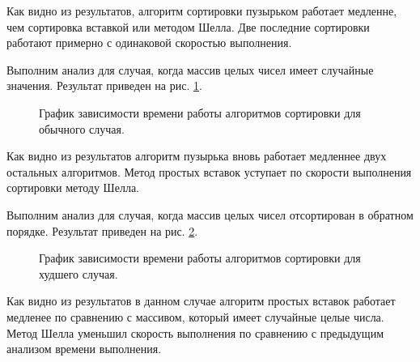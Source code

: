 Как видно из результатов, алгоритм сортировки пузырьком работает медленне, чем сортировка вставкой или методом Шелла. Две последние сортировки работают примерно с одинаковой скоростью выполнения. 

Выполним анализ для случая, когда массив целых чисел имеет случайные значения. Результат приведен на рис. \ref{fg:ref2}.
\begin{figure}[H]
	\centering
	\caption{График зависимости времени работы алгоритмов сортировки для обычного случая.} 
	\label{fg:ref2}
\end{figure}
Как видно из результатов алгоритм пузырька вновь работает медленнее двух остальных алгоритмов. Метод простых вставок уступает по скорости выполнения сортировки методу Шелла. 

Выполним анализ для случая, когда массив целых чисел отсортирован в обратном порядке. Результат приведен на рис. \ref{fg:ref3}.
\begin{figure}[H]
	\centering
	\caption{График зависимости времени работы алгоритмов сортировки для худшего случая.} 
	\label{fg:ref3}
\end{figure}

Как видно из результатов в данном случае алгоритм простых вставок работает медленее по сравнению с массивом, который имеет случайные целые числа. Метод Шелла уменьшил скорость выполнения по сравнению с предыдущим анализом времени выполнения. 

